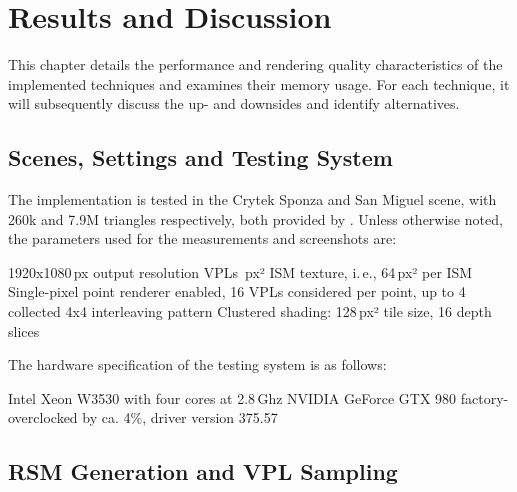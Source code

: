 

\chapter{Results and Discussion}
\label{chap:results}

This chapter details the performance and rendering quality characteristics of the implemented techniques and  examines their memory usage. For each technique, it will subsequently discuss the up- and downsides and identify alternatives.

\section{Scenes, Settings and Testing System}
\label{sec:results:settings}

The implementation is tested in the Crytek Sponza and San Miguel scene, with 260k and 7.9M triangles respectively, both provided by \citet{McGuire2011Data}. Unless otherwise noted, the parameters used for the measurements and screenshots are:
\begin{outline}
    \1 1920x1080\,px output resolution
     VPLs
    \,px² ISM texture, i.\,e., 64\,px² per ISM
    \1 Single-pixel point renderer enabled, 16 VPLs considered per point, up to 4 collected
    \1 4x4 interleaving pattern
    \1 Clustered shading: 128\,px² tile size, 16 depth slices
\end{outline}

\noindent
The hardware specification of the testing system is as follows:
\begin{outline}
    \1 Intel Xeon W3530 with four cores at 2.8\,Ghz
    \1 NVIDIA GeForce GTX 980 factory-overclocked by ca. 4\%, driver version 375.57
\end{outline}


\section{RSM Generation and VPL Sampling}
\label{sec:results:RsmAndVplSampling}

